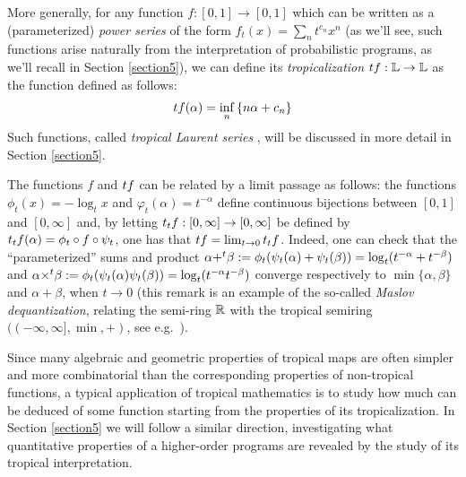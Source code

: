 More generally, for any function $f:[0,1]\to [0,1]$ which can be written as a (parameterized) \emph{power series} of the form $f_{t}(x)= \sum_{n}t^{c_{n}}x^{n}$ (as we'll see, such functions arise naturally from the interpretation of probabilistic programs, as we'll recall in Section \ref{section5}), we can define its \emph{tropicalization} $\trop f: \Lawv \to \Lawv$
as the function defined as follows:
\begin{align}
\trop f(\alpha) =\inf_{n}\left\{ n\alpha+c_{n}\right\}
\end{align}
Such functions, called \emph{tropical Laurent series} \cite{}, will be discussed in more detail in Section \ref{section5}.

The functions $f$ and $\trop f$ can be related by a limit passage as follows: the functions $\phi_{t}(x)= -\log_{t}x$ and $\varphi_{t}(\alpha)= t^{-\alpha}$ define continuous bijections between $[0,1]$ and $[0,\infty]$ and, by letting
$\trop_{t}f: [0,\infty]\to [0,\infty]$ be defined by 
$\trop_{t}f(\alpha)= \phi_{t}\circ f \circ \psi_{t}$, one has that 
$\trop f= \lim_{t\to 0}\trop_{t}f$. 
Indeed, one can check that the ``parameterized'' sums and product $\alpha {+}^{t}\beta:= \phi_{t}(\psi_{t}(\alpha)+\psi_{t}(\beta))= \log_{t}(t^{-\alpha}+t^{-\beta})$ and 
$\alpha {\times}^{t}\beta:= \phi_{t}( \psi_{t}(\alpha)\psi_{t}(\beta))=
\log_{t}(t^{-\alpha}t^{-\beta})$ converge respectively to $\min\{\alpha,\beta\}$ and $\alpha+\beta$, when $t\to 0$ (this remark is an example of the so-called \emph{Maslov dequantization}, relating the semi-ring $\mathbb{R}$ with the tropical semiring $((-\infty, \infty], \min, +)$, see e.g.~\cite{}).



Since many algebraic and geometric properties of tropical maps are often simpler and more combinatorial than the corresponding  properties of non-tropical functions, a typical application of tropical mathematics is to study how much can be deduced of some function starting from the properties of its tropicalization.
In Section \ref{section5} we will follow a similar direction, investigating what quantitative properties of a higher-order programs are revealed by the study of its tropical interpretation.

 

